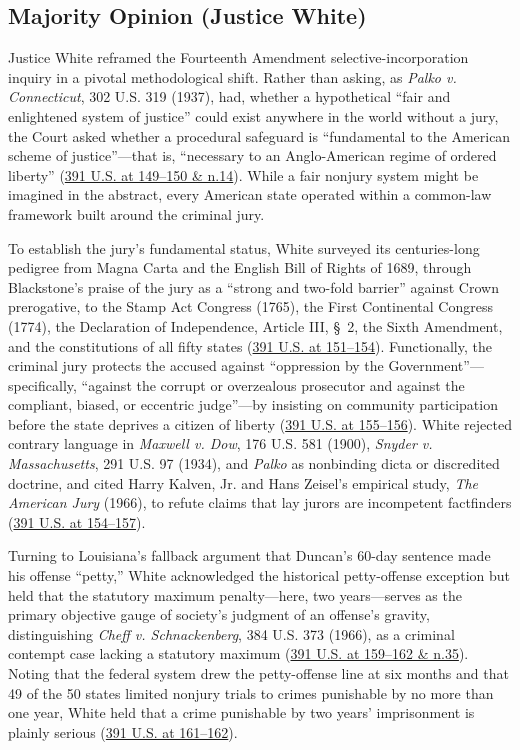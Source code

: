 \documentclass[12pt]{article}
\begin{document}
\subsection{Majority Opinion (Justice White)}

Justice White reframed the Fourteenth Amendment selective-incorporation inquiry in a pivotal methodological shift. Rather than asking, as \textit{Palko v. Connecticut}, 302 U.S. 319 (1937), had, whether a hypothetical ``fair and enlightened system of justice'' could exist anywhere in the world without a jury, the Court asked whether a procedural safeguard is ``fundamental to the American scheme of justice''---that is, ``necessary to an Anglo-American regime of ordered liberty'' (\href{https://supreme.justia.com/cases/federal/us/391/145/}{391 U.S. at 149--150 \& n.14}). While a fair nonjury system might be imagined in the abstract, every American state operated within a common-law framework built around the criminal jury.

To establish the jury's fundamental status, White surveyed its centuries-long pedigree from Magna Carta and the English Bill of Rights of 1689, through Blackstone's praise of the jury as a ``strong and two-fold barrier'' against Crown prerogative, to the Stamp Act Congress (1765), the First Continental Congress (1774), the Declaration of Independence, Article III, \S~2, the Sixth Amendment, and the constitutions of all fifty states (\href{https://supreme.justia.com/cases/federal/us/391/145/}{391 U.S. at 151--154}). Functionally, the criminal jury protects the accused against ``oppression by the Government''---specifically, ``against the corrupt or overzealous prosecutor and against the compliant, biased, or eccentric judge''---by insisting on community participation before the state deprives a citizen of liberty (\href{https://supreme.justia.com/cases/federal/us/391/145/}{391 U.S. at 155--156}). White rejected contrary language in \textit{Maxwell v. Dow}, 176 U.S. 581 (1900), \textit{Snyder v. Massachusetts}, 291 U.S. 97 (1934), and \textit{Palko} as nonbinding dicta or discredited doctrine, and cited Harry Kalven, Jr. and Hans Zeisel's empirical study, \textit{The American Jury} (1966), to refute claims that lay jurors are incompetent factfinders (\href{https://supreme.justia.com/cases/federal/us/391/145/}{391 U.S. at 154--157}).

Turning to Louisiana's fallback argument that Duncan's 60-day sentence made his offense ``petty,'' White acknowledged the historical petty-offense exception but held that the statutory maximum penalty---here, two years---serves as the primary objective gauge of society's judgment of an offense's gravity, distinguishing \textit{Cheff v. Schnackenberg}, 384 U.S. 373 (1966), as a criminal contempt case lacking a statutory maximum (\href{https://supreme.justia.com/cases/federal/us/391/145/}{391 U.S. at 159--162 \& n.35}). Noting that the federal system drew the petty-offense line at six months and that 49 of the 50 states limited nonjury trials to crimes punishable by no more than one year, White held that a crime punishable by two years' imprisonment is plainly serious (\href{https://supreme.justia.com/cases/federal/us/391/145/}{391 U.S. at 161--162}).
\end{document}

